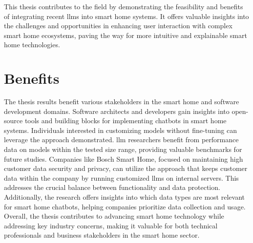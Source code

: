 This thesis contributes to the field by demonstrating the feasibility and benefits of integrating recent \glspl{llm} into smart home systems. It offers valuable insights into the challenges and opportunities in enhancing user interaction with complex smart home ecosystems, paving the way for more intuitive and explainable smart home technologies.

\section{Benefits}
The thesis results benefit various stakeholders in the smart home and software development domains. Software architects and developers gain insights into open-source tools and building blocks for implementing chatbots in smart home systems. Individuals interested in customizing models without fine-tuning can leverage the approach demonstrated. 
\gls{llm} researchers benefit from performance data on models within the tested size range, providing valuable benchmarks for future studies. 
Companies like Bosch Smart Home, focused on maintaining high customer data security and privacy, can utilize the approach that keeps customer data within the company by running customized \glspl{llm} on internal servers. 
This addresses the crucial balance between functionality and data protection. Additionally, the research offers insights into which data types are most relevant for smart home chatbots, helping companies prioritize data collection and usage. 
Overall, the thesis contributes to advancing smart home technology while addressing key industry concerns, making it valuable for both technical professionals and business stakeholders in the smart home sector.

